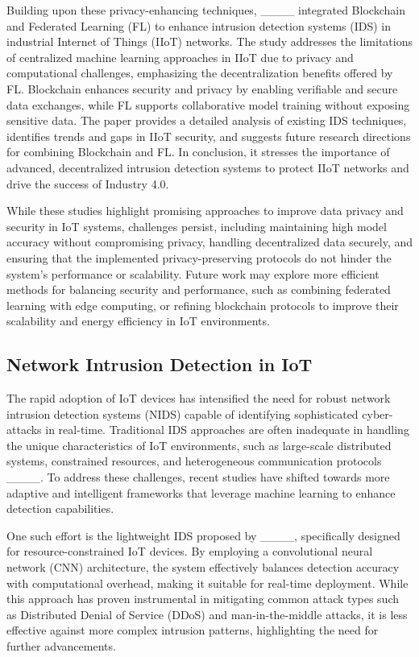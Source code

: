Building upon these privacy-enhancing techniques, ____ integrated Blockchain and Federated Learning (FL) to enhance intrusion detection systems (IDS) in industrial Internet of Things (IIoT) networks. The study addresses the limitations of centralized machine learning approaches in IIoT due to privacy and computational challenges, emphasizing the decentralization benefits offered by FL. Blockchain enhances security and privacy by enabling verifiable and secure data exchanges, while FL supports collaborative model training without exposing sensitive data. The paper provides a detailed analysis of existing IDS techniques, identifies trends and gaps in IIoT security, and suggests future research directions for combining Blockchain and FL. In conclusion, it stresses the importance of advanced, decentralized intrusion detection systems to protect IIoT networks and drive the success of Industry 4.0.

While these studies highlight promising approaches to improve data privacy and security in IoT systems, challenges persist, including maintaining high model accuracy without compromising privacy, handling decentralized data securely, and ensuring that the implemented privacy-preserving protocols do not hinder the system's performance or scalability. Future work may explore more efficient methods for balancing security and performance, such as combining federated learning with edge computing, or refining blockchain protocols to improve their scalability and energy efficiency in IoT environments.
\subsection{Network Intrusion Detection in IoT}

The rapid adoption of IoT devices has intensified the need for robust network intrusion detection systems (NIDS) capable of identifying sophisticated cyber-attacks in real-time. Traditional IDS approaches are often inadequate in handling the unique characteristics of IoT environments, such as large-scale distributed systems, constrained resources, and heterogeneous communication protocols ____. To address these challenges, recent studies have shifted towards more adaptive and intelligent frameworks that leverage machine learning to enhance detection capabilities.

One such effort is the lightweight IDS proposed by ____, specifically designed for resource-constrained IoT devices. By employing a convolutional neural network (CNN) architecture, the system effectively balances detection accuracy with computational overhead, making it suitable for real-time deployment. While this approach has proven instrumental in mitigating common attack types such as Distributed Denial of Service (DDoS) and man-in-the-middle attacks, it is less effective against more complex intrusion patterns, highlighting the need for further advancements.

